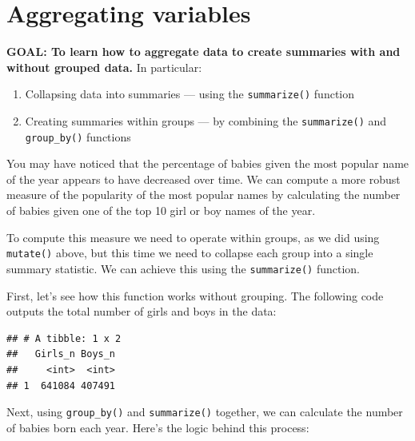 \documentclass[]{book}
\newenvironment{Shaded}{\begin{snugshade}}{\end{snugshade}}
\newcommand{\KeywordTok}[1]{\textcolor[rgb]{0.13,0.29,0.53}{\textbf{#1}}}
\newcommand{\DataTypeTok}[1]{\textcolor[rgb]{0.13,0.29,0.53}{#1}}
\newcommand{\StringTok}[1]{\textcolor[rgb]{0.31,0.60,0.02}{#1}}
\newcommand{\OperatorTok}[1]{\textcolor[rgb]{0.81,0.36,0.00}{\textbf{#1}}}
\newcommand{\NormalTok}[1]{#1}
\providecommand{\tightlist}{%
  \setlength{\itemsep}{0pt}\setlength{\parskip}{0pt}}
\begin{document}
\section{Aggregating variables}\label{aggregating-variables}

\textbf{GOAL: To learn how to aggregate data to create summaries with
and without grouped data.} In particular:

\begin{enumerate}
\def\labelenumi{\arabic{enumi}.}
\tightlist
\item
  Collapsing data into summaries --- using the \texttt{summarize()}
  function
\item
  Creating summaries within groups --- by combining the
  \texttt{summarize()} and \texttt{group\_by()} functions
\end{enumerate}

You may have noticed that the percentage of babies given the most
popular name of the year appears to have decreased over time. We can
compute a more robust measure of the popularity of the most popular
names by calculating the number of babies given one of the top 10 girl
or boy names of the year.

To compute this measure we need to operate within groups, as we did
using \texttt{mutate()} above, but this time we need to collapse each
group into a single summary statistic. We can achieve this using the
\texttt{summarize()} function.

First, let's see how this function works without grouping. The following
code outputs the total number of girls and boys in the data:

\begin{Shaded}
\end{Shaded}

\begin{verbatim}
## # A tibble: 1 x 2
##   Girls_n Boys_n
##     <int>  <int>
## 1  641084 407491
\end{verbatim}

Next, using \texttt{group\_by()} and \texttt{summarize()} together, we
can calculate the number of babies born each year. Here's the logic
behind this process:
\end{document}
